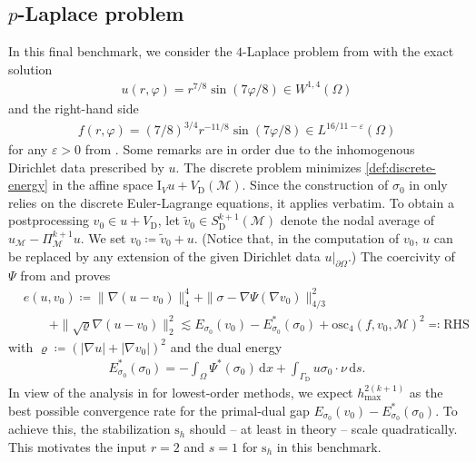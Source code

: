 \documentclass[a4paper]{amsart}
\numberwithin{equation}{section}
\renewcommand{\d}[1]{\,\mathrm{d}#1}
\newcommand{\I}{\mathrm{I}}
\newcommand{\Mcal}{\mathcal{M}}
\newcommand{\s}{\mathrm{s}}
\newcommand{\osc}{\mathrm{osc}}
\theoremstyle{remark}
\begin{document}
\subsection{$p$-Laplace problem}\label{sec:plaplace}
In this final benchmark, we consider the $4$-Laplace problem from  with the exact solution
\begin{align*}
	u(r,\varphi) = r^{7/8}\sin(7\varphi/8) \in W^{1,4}(\Omega)
\end{align*}
and the right-hand side
\begin{align*}
	f(r,\varphi) = (7/8)^{3/4}r^{-11/8}\sin(7\varphi/8) \in L^{16/11-\varepsilon}(\Omega)
\end{align*}
for any $\varepsilon > 0$ from \cite{CKlose2003}.
Some remarks are in order due to the inhomogenous Dirichlet data prescribed by $u$.
The discrete problem minimizes \eqref{def:discrete-energy} in the affine space $\I_V u + V_\mathrm{D}(\Mcal)$.
Since the construction of $\sigma_0$ in  only relies on the discrete Euler-Lagrange equations, it applies verbatim.
To obtain a postprocessing $v_0 \in u + V_\mathrm{D}$, let $\widetilde{v}_0 \in S^{k+1}_\mathrm{D}(\Mcal)$ denote the nodal average of $u_\Mcal - \Pi_\Mcal^{k+1} u$. We set $v_0 \coloneqq \widetilde{v}_0 + u$.
(Notice that, in the computation of $v_0$, $u$ can be replaced by any extension of the given Dirichlet data $u|_{\partial \Omega}$.)
The coercivity of $\Psi$ from  and  proves
\begin{align*}
	&e(u,v_0) \coloneqq \|\nabla(u - v_0)\|_4^4 + \|\sigma - \nabla \Psi(\nabla v_0)\|_{4/3}^2\\
	&\qquad + \|\sqrt{\varrho}\nabla(u - v_0)\|^2_2 \lesssim E_{\sigma_0}(v_0) - E^*_{\sigma_0}(\sigma_0) + \osc_4(f,v_0,\Mcal)^2 \eqqcolon \mathrm{RHS}
\end{align*}
with $\varrho \coloneqq (|\nabla u| + |\nabla v_0|)^{2}$ and the dual energy
\begin{align*}
	E_{\sigma_0}^*(\sigma_0) = - \int_\Omega \Psi^*(\sigma_0) \d{x} + \int_{\Gamma_\mathrm{D}} u \sigma_0 \cdot \nu \d{s}.
\end{align*}
In view of the analysis in \cite{DieningKreuzer2008,kaltenbach2022} for lowest-order methods, we expect $h_{\max}^{2(k+1)}$ as the best possible convergence rate for the primal-dual gap $E_{\sigma_0}(v_0) - E_{\sigma_0}^*(\sigma_0)$.
To achieve this, the stabilization $\s_h$ should -- at least in theory -- scale quadratically. This motivates the input $r = 2$ and $s = 1$ for $\s_h$ in this benchmark.
\end{document}
